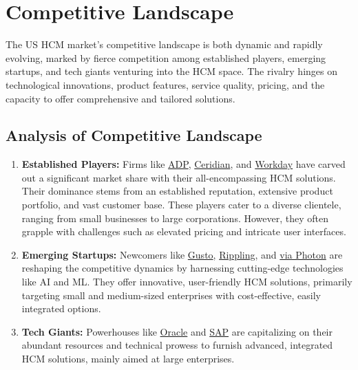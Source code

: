 \documentclass[
  a4paper,
]{book}
\renewcommand{\labelenumi}{\textbf{\textcolor{com-color}{\arabic*.}}}%
\begin{document}
\hypertarget{competitive-landscape}{%
\section{Competitive Landscape}\label{competitive-landscape}}

The US HCM market's competitive landscape is both dynamic and rapidly
evolving, marked by fierce competition among established players,
emerging startups, and tech giants venturing into the HCM space. The
rivalry hinges on technological innovations, product features, service
quality, pricing, and the capacity to offer comprehensive and tailored
solutions.

\hypertarget{analysis-of-competitive-landscape}{%
\subsection{Analysis of Competitive
Landscape}\label{analysis-of-competitive-landscape}}

\begin{enumerate}
\def\labelenumi{\arabic{enumi}.}
\item
  \textbf{Established Players:} Firms like
  \href{https://www.adp.com/}{ADP},
  \href{https://www.ceridian.com/}{Ceridian}, and
  \href{https://www.workday.com/}{Workday} have carved out a significant
  market share with their all-encompassing HCM solutions. Their
  dominance stems from an established reputation, extensive product
  portfolio, and vast customer base. These players cater to a diverse
  clientele, ranging from small businesses to large corporations.
  However, they often grapple with challenges such as elevated pricing
  and intricate user interfaces.
\item
  \textbf{Emerging Startups:} Newcomers like
  \href{https://gusto.com/}{Gusto},
  \href{https://www.rippling.com/}{Rippling}, and
  \href{https://www.viaphoton.com/}{via Photon} are reshaping the
  competitive dynamics by harnessing cutting-edge technologies like AI
  and ML. They offer innovative, user-friendly HCM solutions, primarily
  targeting small and medium-sized enterprises with cost-effective,
  easily integrated options.
\item
  \textbf{Tech Giants:} Powerhouses like
  \href{https://www.oracle.com/}{Oracle} and
  \href{https://www.sap.com/}{SAP} are capitalizing on their abundant
  resources and technical prowess to furnish advanced, integrated HCM
  solutions, mainly aimed at large enterprises.
\end{enumerate}
\end{document}
